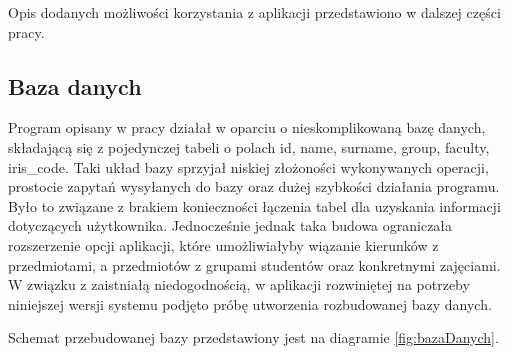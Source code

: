 \begin{figure}
\label{fig:program}
\end{figure}

Opis dodanych możliwości korzystania z aplikacji przedstawiono w dalszej części pracy.

\begin{figure}
\label{fig:dodajSpecjalizacje}
\end{figure}

\begin{figure}
\label{fig:dodajGrupe}
\end{figure}

\begin{figure}
\label{fig:dodajPrzedmiot}
\end{figure}

\begin{figure}
\label{fig:dodajTemat}
\end{figure}

\begin{figure}
\label{fig:dodajZajecia}
\end{figure}

\begin{figure}
\label{fig:oknoGlowne}
\end{figure}

\begin{figure}
\label{fig:wybraneTabele}
\end{figure}

\subsection{Baza danych}
\label{subsec:baza}

Program opisany w pracy \cite{Gl11} działał w oparciu o nieskomplikowaną bazę danych, składającą się z pojedynczej tabeli o polach id, name, surname, group, faculty, iris_code. Taki układ bazy sprzyjał niskiej złożoności wykonywanych operacji, prostocie zapytań wysyłanych do bazy oraz dużej szybkości działania programu. Było to związane z brakiem konieczności łączenia tabel dla uzyskania informacji dotyczących użytkownika. Jednocześnie jednak taka budowa ograniczała rozszerzenie opcji aplikacji, które umożliwiałyby wiązanie kierunków z przedmiotami, a przedmiotów z grupami studentów oraz konkretnymi zajęciami. W związku z zaistniałą niedogodnością, w aplikacji rozwiniętej na potrzeby niniejszej wersji systemu podjęto próbę utworzenia rozbudowanej bazy danych.

Schemat przebudowanej bazy przedstawiony jest na diagramie \ref{fig:bazaDanych}.

